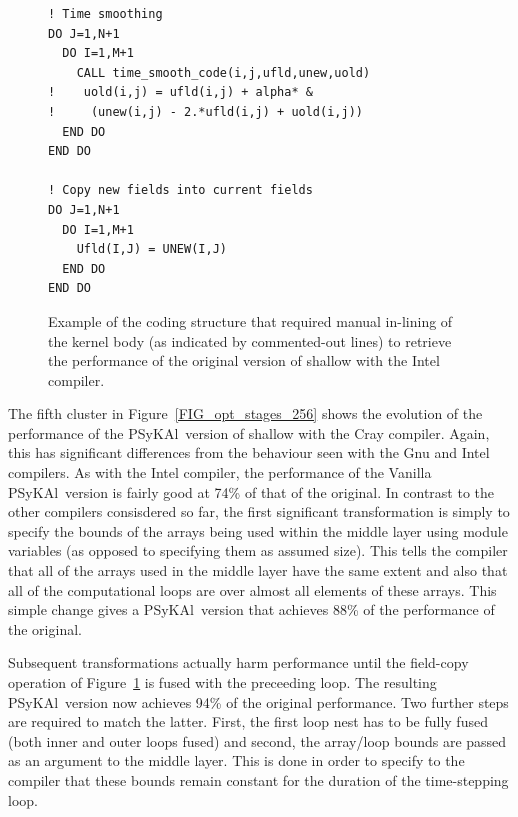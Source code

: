 \documentclass[journal]{IEEEtran}
\newcommand{\psykal}{{PS}y{KA}l\ }
\begin{document}
\begin{figure}
\begin{verbatim}
! Time smoothing
DO J=1,N+1
  DO I=1,M+1
    CALL time_smooth_code(i,j,ufld,unew,uold)
!    uold(i,j) = ufld(i,j) + alpha* &
!     (unew(i,j) - 2.*ufld(i,j) + uold(i,j))
  END DO
END DO

! Copy new fields into current fields
DO J=1,N+1
  DO I=1,M+1
    Ufld(I,J) = UNEW(I,J)
  END DO
END DO
\end{verbatim}
\caption{Example of the coding structure that required manual
  in-lining of the kernel body (as indicated by commented-out lines)
  to retrieve the performance of the original version of shallow with
  the Intel compiler.}
\label{FIG_time_smooth_code}
\end{figure}

The fifth cluster in Figure~\ref{FIG_opt_stages_256} shows the
evolution of the performance of the \psykal version of shallow with
the Cray compiler. Again, this has significant differences from the
behaviour seen with the Gnu and Intel compilers. As with the Intel
compiler, the performance of the Vanilla \psykal version is fairly
good at 74\% of that of the original. In contrast to the other
compilers consisdered so far, the first significant transformation is
simply to specify the bounds of the arrays being used within the
middle layer using module variables (as opposed to specifying them as
assumed size). This tells the compiler that all of the arrays used in
the middle layer have the same extent and also that all of the
computational loops are over almost all elements of these arrays. This
simple change gives a \psykal version that achieves 88\% of the
performance of the original.

Subsequent transformations actually harm performance until the
field-copy operation of Figure~\ref{FIG_time_smooth_code} is fused
with the preceeding loop. The resulting \psykal version now achieves
94\% of the original performance. Two further steps are required to
match the latter. First, the first loop nest has to be fully fused
(both inner and outer loops fused) and second, the array/loop bounds
are passed as an argument to the middle layer. This is done in order
to specify to the compiler that these bounds remain constant for the
duration of the time-stepping loop.

\end{document}
